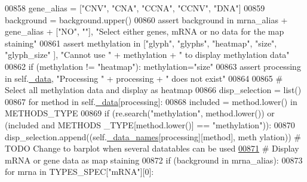 \begin{DoxyCode}
00858         gene\_alias = [\textcolor{stringliteral}{"CNV"}, \textcolor{stringliteral}{"CNA"}, \textcolor{stringliteral}{"CCNA"}, \textcolor{stringliteral}{"CCNV"}, \textcolor{stringliteral}{"DNA"}]
00859         background = background.upper()
00860         \textcolor{keyword}{assert} background \textcolor{keywordflow}{in} mrna\_alias + gene\_alias + [\textcolor{stringliteral}{"NO"}, \textcolor{stringliteral}{""}], \textcolor{stringliteral}{"Select either
       genes, mRNA or no data for the map staining"}
00861         \textcolor{keyword}{assert} methylation \textcolor{keywordflow}{in} [\textcolor{stringliteral}{"glyph"}, \textcolor{stringliteral}{"glyphs"}, \textcolor{stringliteral}{"heatmap"}, \textcolor{stringliteral}{"size"}, \textcolor{stringliteral}{"glyph\_size"
      }], \textcolor{stringliteral}{"Cannot use "} + methylation + \textcolor{stringliteral}{" to display methylation data"}
00862         \textcolor{keywordflow}{if} (methylation != \textcolor{stringliteral}{"heatmap"}): methylation=\textcolor{stringliteral}{"size"}
00863         \textcolor{keyword}{assert} processing \textcolor{keywordflow}{in} self.\hyperlink{classnavicom_1_1navicom_1_1NaviCom_a407b2b5c30a5652ee85c4be54b3e6679}{_data}, \textcolor{stringliteral}{"Processing "} + processing + \textcolor{stringliteral}{" does not 
      exist"}
00864 
00865         \textcolor{comment}{# Select all methylation data and display as heatmap}
00866         disp\_selection = list()
00867         \textcolor{keywordflow}{for} method \textcolor{keywordflow}{in} self.\hyperlink{classnavicom_1_1navicom_1_1NaviCom_a407b2b5c30a5652ee85c4be54b3e6679}{_data}[processing]:
00868             included = method.lower() \textcolor{keywordflow}{in} METHODS\_TYPE
00869             \textcolor{keywordflow}{if} (re.search(\textcolor{stringliteral}{"methylation"}, method.lower()) \textcolor{keywordflow}{or} (included \textcolor{keywordflow}{and} METHODS
      \_TYPE[method.lower()] == \textcolor{stringliteral}{"methylation"})):
00870                 disp\_selection.append((self.\hyperlink{classnavicom_1_1navicom_1_1NaviCom_ab8c34ab1a6d2a23f9b9ecee65375317a}{_data_names}[processing][method], meth
      ylation)) \textcolor{comment}{# TODO Change to barplot when several datatables can be used}
\hypertarget{navicom_8py_source_l00871}{}\hyperlink{classnavicom_1_1navicom_1_1NaviCom_a018f936de625af8a5dd7e8250ede6483}{00871}         \textcolor{comment}{# Display mRNA or gene data as map staining}
00872         \textcolor{keywordflow}{if} (background \textcolor{keywordflow}{in} mrna\_alias):
00873             \textcolor{keywordflow}{for} mrna \textcolor{keywordflow}{in} TYPES\_SPEC[\textcolor{stringliteral}{"mRNA"}][0]:

\end{DoxyCode}

